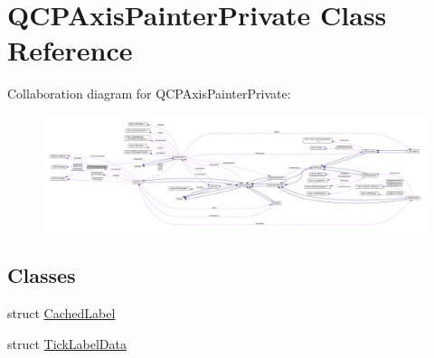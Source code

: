 \hypertarget{class_q_c_p_axis_painter_private}{}\section{Q\+C\+P\+Axis\+Painter\+Private Class Reference}
\label{class_q_c_p_axis_painter_private}


Collaboration diagram for Q\+C\+P\+Axis\+Painter\+Private\+:\nopagebreak
\begin{figure}[H]
\begin{center}
\leavevmode
\includegraphics[width=350pt]{class_q_c_p_axis_painter_private__coll__graph}
\end{center}
\end{figure}
\subsection*{Classes}
\begin{DoxyCompactItemize}
\item 
struct \hyperlink{struct_q_c_p_axis_painter_private_1_1_cached_label}{Cached\+Label}
\item 
struct \hyperlink{struct_q_c_p_axis_painter_private_1_1_tick_label_data}{Tick\+Label\+Data}
\end{DoxyCompactItemize}
